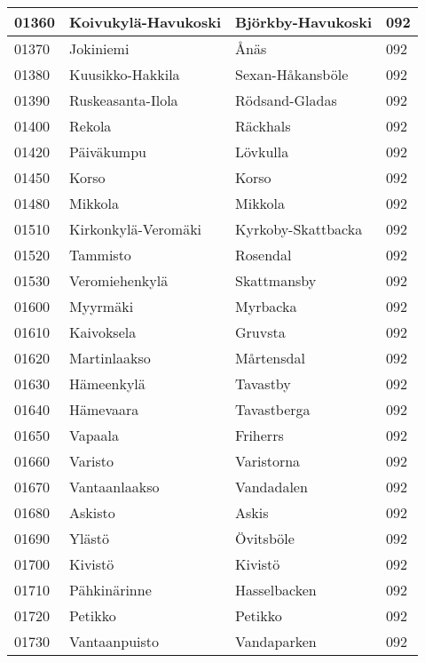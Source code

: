 \begin{center}
\begin{longtable}{|l l l l|}
        01360 & Koivukylä-Havukoski & Björkby-Havukoski & 092 \\ [0.25ex] \hline
        01370 & Jokiniemi & Ånäs & 092 \\ [0.25ex] \hline
        01380 & Kuusikko-Hakkila & Sexan-Håkansböle & 092 \\ [0.25ex] \hline
        01390 & Ruskeasanta-Ilola & Rödsand-Gladas & 092 \\ [0.25ex] \hline
        01400 & Rekola & Räckhals & 092 \\ [0.25ex] \hline
        01420 & Päiväkumpu & Lövkulla & 092 \\ [0.25ex] \hline
        01450 & Korso & Korso & 092 \\ [0.25ex] \hline
        01480 & Mikkola & Mikkola & 092 \\ [0.25ex] \hline
        01510 & Kirkonkylä-Veromäki & Kyrkoby-Skattbacka & 092 \\ [0.25ex] \hline
        01520 & Tammisto & Rosendal & 092 \\ [0.25ex] \hline
        01530 & Veromiehenkylä & Skattmansby & 092 \\ [0.25ex] \hline
        01600 & Myyrmäki & Myrbacka & 092 \\ [0.25ex] \hline
        01610 & Kaivoksela & Gruvsta & 092 \\ [0.25ex] \hline
        01620 & Martinlaakso & Mårtensdal & 092 \\ [0.25ex] \hline
        01630 & Hämeenkylä & Tavastby & 092 \\ [0.25ex] \hline
        01640 & Hämevaara & Tavastberga & 092 \\ [0.25ex] \hline
        01650 & Vapaala & Friherrs & 092 \\ [0.25ex] \hline
        01660 & Varisto & Varistorna & 092 \\ [0.25ex] \hline
        01670 & Vantaanlaakso & Vandadalen & 092 \\ [0.25ex] \hline
        01680 & Askisto & Askis & 092 \\ [0.25ex] \hline
        01690 & Ylästö & Övitsböle & 092 \\ [0.25ex] \hline
        01700 & Kivistö & Kivistö & 092 \\ [0.25ex] \hline
        01710 & Pähkinärinne & Hasselbacken & 092 \\ [0.25ex] \hline
        01720 & Petikko & Petikko & 092 \\ [0.25ex] \hline
        01730 & Vantaanpuisto & Vandaparken & 092 \\ [0.25ex] \hline

\end{longtable}
\end{center}
